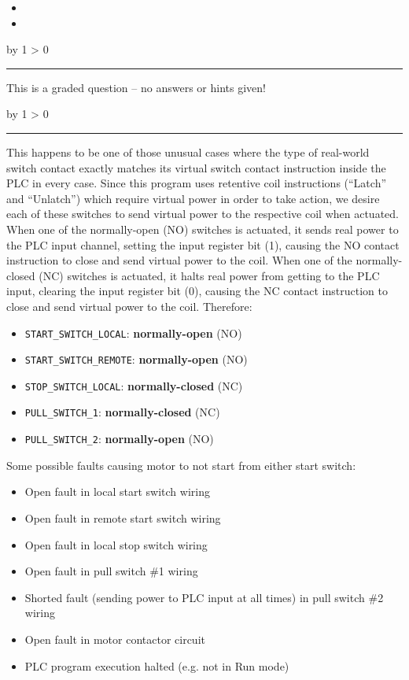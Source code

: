 \documentclass[12pt,a4paper]{article}
\def\svar{
           \advance\answnum by 1
           \ifnum \answnum > 0
                \hrule
                \vskip 3pt
                \leftline{Svar \the\answnum}
                \vskip 3pt \fi}
\def\notes{
           \advance\explnum by 1
           \ifnum \explnum > 0
                \hrule
                \vskip 3pt
                \leftline{Notes \the\explnum}
                \vskip 3pt \fi}
\begin{document}
\vskip 10pt

\begin{itemize}
\item{} 
\vskip 20pt
\item{} 
\end{itemize}

\vfil
{}
\eject
\vskip 10pt \filbreak 





\svar{} 

This is a graded question -- no answers or hints given!

\vskip 10pt \filbreak 





\notes{} 

This happens to be one of those unusual cases where the type of real-world switch contact exactly matches its virtual switch contact instruction inside the PLC in every case.  Since this program uses retentive coil instructions (``Latch'' and ``Unlatch'') which require virtual power in order to take action, we desire each of these switches to send virtual power to the respective coil when actuated.  When one of the normally-open (NO) switches is actuated, it sends real power to the PLC input channel, setting the input register bit (1), causing the NO contact instruction to close and send virtual power to the coil.  When one of the normally-closed (NC) switches is actuated, it halts real power from getting to the PLC input, clearing the input register bit (0), causing the NC contact instruction to close and send virtual power to the coil.  Therefore:

\begin{itemize}
\item{} {\tt START\_SWITCH\_LOCAL}: {\bf normally-open} (NO)
\item{} {\tt START\_SWITCH\_REMOTE}: {\bf normally-open} (NO)
\item{} {\tt STOP\_SWITCH\_LOCAL}: {\bf normally-closed} (NC)
\item{} {\tt PULL\_SWITCH\_1}: {\bf normally-closed} (NC)
\item{} {\tt PULL\_SWITCH\_2}: {\bf normally-open} (NO)
\end{itemize}

\vskip 10pt

\noindent
Some possible faults causing motor to not start from either start switch:

\begin{itemize}
\item{} Open fault in local start switch wiring
\item{} Open fault in remote start switch wiring
\item{} Open fault in local stop switch wiring
\item{} Open fault in pull switch \#1 wiring
\item{} Shorted fault (sending power to PLC input at all times) in pull switch \#2 wiring
\item{} Open fault in motor contactor circuit
\item{} PLC program execution halted (e.g. not in Run mode)
\end{itemize}
\end{document}
